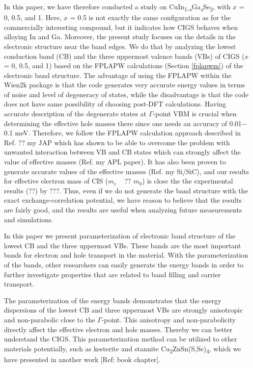 \documentclass[a4paper, 12pt, titlepage,oneside,drop]{kthesis}
\begin{document}
\begin{enumerate}
In this paper, we have therefore conducted a study on CuIn\textsubscript{1-\textit{x}}Ga\textsubscript{\textit{x}}Se\textsubscript{2}, with $x$ = 0, 0.5, and 1. Here, $x$ = 0.5 is not exactly the same configuration as for the
commercially interesting compound, but it indicates how CIGS behaves when alloying In and Ga. Moreover, the present study focuses on the details in the electronic structure near the band edges. We do that by analyzing
the lowest conduction band (CB) and the three uppermost valence bands (VBs) of CIGS ($x$ = 0, 0.5, and 1) based on the FPLAPW calculations (Section \ref{fplapwm}) of the electronic band structure. The advantage of using the FPLAPW within the 
Wien2k package is that the code generates very accurate energy values in terms of noise and level of degeneracy of states, while the disadvantage is that the code does not have same possibility of choosing post-DFT calculations.
Having accurate description of the degenerate states at $\Gamma$-point VBM is crucial when determining the effective hole masses there since one needs an accuracy of 0.01$-$0.1 meV. Therefore, we follow the FPLAPW calculation approach
described in Ref. ?? {my JAP} which has shown to be able to overcome the problem with unwanted interaction between VB and CB states which can strongly affect the value of effective masses (Ref. my APL paper). It has also been proven
to generate accurate values of the effective masses (Ref. my Si/SiC), and our results for effective electron mass of CIS ($m_c$ ~ ?? $m_0$) is close the the experimental results (??) by ???.   
Thus, even if we do not generate the band structure with the exact exchange-correlation potential, we have reason to believe that the results are fairly good, and the results are useful when analyzing future measurements and simulations.

In this paper we present parameterization of electronic band structure of the lowest CB and the three uppermost VBs. These bands are the most important bands for electron and hole transport in the material. With the parameterization
of the bands, other researchers can easily generate the energy bands in order to further investigate properties that are related to band filling and carrier transport. 

The parameterization of the energy bands demonstrates that the energy dispersions of the lowest CB and three uppermost VBs are strongly anisotropic and non-parabolic close to the $\Gamma$-point. This anisotropy and non-parabolicity 
directly affect the effective electron and hole masses. Thereby we can better understand the CIGS. This parameterization method can be utilized to other materials potentially, such as kesterite and stannite 
Cu\textsubscript{2}ZnSn(S,Se)\textsubscript{4}, which we have presented in another work [Ref: book chapter].


\end{enumerate}
\end{document}

